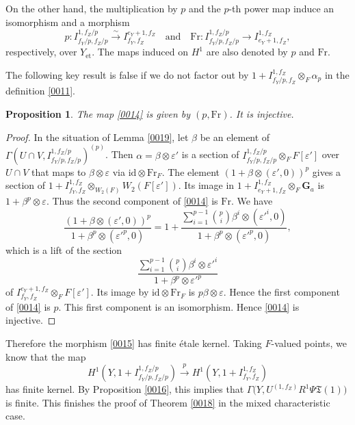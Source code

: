 \documentclass{amsart}
\newtheorem{Prop}[Thm]{Proposition}
\theoremstyle{remark}
\numberwithin{equation}{section}
\newcommand{\isomto}{\overset{\sim}{\to}}
\newcommand{\tensor}{\mathbin{\otimes}}
\newcommand{\et}{\mathrm{et}}
\newcommand{\id}{\mathrm{id}}
\newcommand{\Ga}{\mathbf{G}_{a}}
\newcommand{\Frob}{\mathrm{Fr}}
\begin{document}
On the other hand, the multiplication by $p$ and the $p$-th power map
induce an isomorphism and a morphism
	\[
			p
		\colon
			I^{1, f_{Z} / p}_{f_{Y} / p, f_{Z} / p}
		\isomto
			I^{e_{Y} + 1, f_{Z}}_{f_{Y}, f_{Z}}
		\quad \text{and} \quad
			\Frob
		\colon
			I^{1, f_{Z} / p}_{f_{Y} / p, f_{Z} / p}
		\to
			I^{1, f_{Z}}_{e_{Y} + 1, f_{Z}},
	\]
respectively, over $Y_{\et}$.
The maps induced on $H^{1}$ are also denoted by $p$ and $\Frob$.

The following key result is false
if we do not factor out by $1 + I^{1, f_{Z}}_{f_{Y} / p, f_{Z}} \tensor_{F} \alpha_{p}$
in the definition \eqref{0011}.

\begin{Prop}
	The map \eqref{0014} is given by $(p, \Frob)$.
	It is injective.
\end{Prop}

\begin{proof}
	In the situation of Lemma \ref{0019},
	let $\beta$ be an element of
	$\Gamma(U \cap V, I^{1, f_{Z} / p}_{f_{Y} / p, f_{Z} / p})^{(p)}$.
	Then $\alpha = \beta \tensor \varepsilon'$ is a section of
	$I^{1, f_{Z} / p}_{f_{Y} / p, f_{Z} / p} \tensor_{F} F[\varepsilon']$
	over $U \cap V$ that maps to $\beta \tensor \varepsilon$ via $\id \tensor \Frob_{F}$.
	The element $(1 + \beta \tensor (\varepsilon', 0))^{p}$ gives a section of
		$
				1
			+		I^{1, f_{Z}}_{f_{Y}, f_{Z}}
				\tensor_{W_{2}(F)}
					W_{2}(F[\varepsilon'])
		$.
	Its image in
		$
				1
			+
				I^{1, f_{Z}}_{e_{Y} + 1, f_{Z}}
			\tensor_{F}
				\Ga
		$
	is $1 + \beta^{p} \tensor \varepsilon$.
	Thus the second component of \eqref{0014} is $\Frob$.
	We have
		\[
				\frac{
					(1 + \beta \tensor (\varepsilon', 0))^{p}
				}{
					1 + \beta^{p} \tensor (\varepsilon'^{p}, 0)
				}
			=
					1
				+
					\frac{
						\sum_{i = 1}^{p - 1}
							\binom{p}{i}
							\beta^{i} \tensor (\varepsilon'^{i}, 0)
					}{
						1 + \beta^{p} \tensor (\varepsilon'^{p}, 0)
					},
		\]
	which is a lift of the section
		\[
			\frac{
				\sum_{i = 1}^{p - 1}
					\binom{p}{i}
					\beta^{i} \tensor \varepsilon'^{i}
			}{
				1 + \beta^{p} \tensor \varepsilon'^{p}
			}
		\]
	of $I^{e_{Y} + 1, f_{Z}}_{f_{Y}, f_{Z}} \tensor_{F} F[\varepsilon']$.
	Its image by $\id \tensor \Frob_{F}$ is $p \beta \tensor \varepsilon$.
	Hence the first component of \eqref{0014} is $p$.
	This first component is an isomorphism.
	Hence \eqref{0014} is injective.
\end{proof}

Therefore the morphism \eqref{0015} has finite \'etale kernel.
Taking $F$-valued points, we know that the map
	\[
			H^{1}(Y, 1 + I^{1, f_{Z} / p}_{f_{Y} / p, f_{Z} / p})
		\stackrel{p}{\to}
			H^{1}(Y, 1 + I^{1, f_{Z}}_{f_{Y}, f_{Z}})
	\]
has finite kernel.
By Proposition \ref{0016},
this implies that
	$
		\Gamma \bigl(
			Y,
			U^{(1, f_{Z})} R^{1} \Psi \mathfrak{T}(1)
		\bigr)
	$
is finite.
This finishes the proof of Theorem \ref{0018} in the mixed characteristic case.
\end{document}
